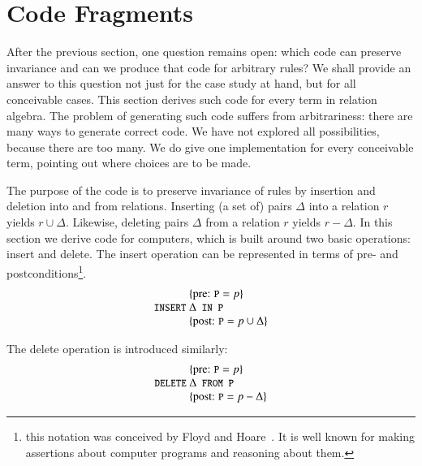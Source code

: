 \documentclass{elsarticle}
\begin{document}
\section{Code Fragments}
\label{sct:Code Fragments}
	After the previous section, one question remains open: which code can preserve invariance and can we produce that code for arbitrary rules?
	We shall provide an answer to this question not just for the case study at hand, but for all conceivable cases.
	This section derives such code for every term in relation algebra.
	The problem of generating such code suffers from arbitrariness: there are many ways to generate correct code.
	We have not explored all possibilities, because there are too many.
	We do give one implementation for every conceivable term, pointing out where choices are to be made.

	The purpose of the code is to preserve invariance of rules by insertion and deletion into and from relations.
	Inserting (a set of) pairs $\Delta$ into a relation $r$ yields $r\cup\Delta$.
	Likewise, deleting pairs $\Delta$ from a relation $r$ yields $r-\Delta$.
	In this section we derive code for computers,
	which is built around two basic operations: insert and delete.
	The insert operation can be represented in terms of pre- and postconditions\footnote{this notation
	was conceived by Floyd and Hoare~\cite{Floyd1967,Hoare1969}.
	It is well known for making assertions about computer programs and reasoning about them.}.
\[\begin{array}{r@{~}l}
&\{\text{pre: }\code{P}=p\}\\
\code{INSERT}&\Delta\code{ IN P}\\
&\{\text{post: }\code{P}=p\cup\Delta\}\\
\end{array}\]

	The delete operation is introduced similarly:
\[\begin{array}{r@{~}l}
&\{\text{pre: }\code{P}=p\}\\
\code{DELETE}&\Delta\code{ FROM P}\\
&\{\text{post: }\code{P}=p-\Delta\}\\
\end{array}\]
	
\end{document}

